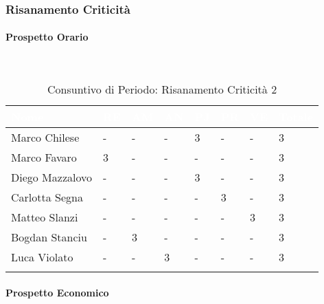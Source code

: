 \subsubsection{Risanamento Criticità}
\label{RA2}

\paragraph{Prospetto Orario} \-\\

\begin{longtable}{|C{.30\textwidth}|C{.06\textwidth}|C{.06\textwidth}|C{.06\textwidth} | C{.06\textwidth}| C{.06\textwidth} | C{.06\textwidth} | C{.10\textwidth} |}
\hline
{}	\textbf{\textcolor{white}{Nome}} & \textbf{\textcolor{white}{RE}} & \textbf{\textcolor{white}{AM}} & \textbf{\textcolor{white}{AN}} & \textbf{\textcolor{white}{PJ}} & \textbf{\textcolor{white}{PR}} & \textbf{\textcolor{white}{VE}} & \textbf{\textcolor{white}{Totale}}\\
\hline \hline

Marco Chilese & - & - & - & 3 & - & - & 3\\
\hline
{}Marco Favaro & 3 & - & - & - & - & - & 3 \\
\hline
Diego Mazzalovo & - & - & - & 3 & - & - & 3 \\
\hline
{}Carlotta Segna & - & - & - & - & 3 & - & 3\\
\hline
Matteo Slanzi & - & - & - & - & - & 3 & 3\\
\hline
{}Bogdan Stanciu & - & 3 & - & - & - & - & 3 \\
\hline
Luca Violato & - & - & 3 & - & - & - & 3 \\
\hline

\caption{Consuntivo di Periodo: Risanamento Criticità 2}
\label{Distribuzione oraria del periodo di rc2}
\end{longtable}

\paragraph{Prospetto Economico} \-\\


